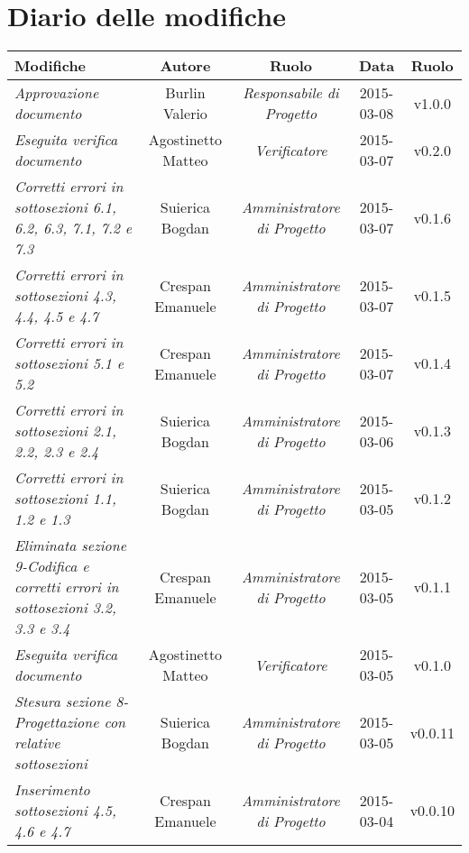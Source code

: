 \newpage
\section*{Diario delle modifiche}

\begin{table}[h]
\centering
\begin{tabular}{|p{}|c|c|c|c|}
	\toprule
		\textbf{Modifiche} & \textbf{Autore} & \textbf{Ruolo} & \textbf{Data} & \textbf{Ruolo} \\
	\midrule
	\midrule
		\textit{Approvazione documento} & Burlin Valerio & \textit{Responsabile di Progetto} & 2015-03-08 & v1.0.0 \\
	\midrule
		\textit{Eseguita verifica documento} & Agostinetto Matteo & \textit{Verificatore} & 2015-03-07 & v0.2.0 \\
	\midrule
		\textit{Corretti errori in sottosezioni 6.1, 6.2, 6.3, 7.1, 7.2 e 7.3} & Suierica Bogdan & \textit{Amministratore di Progetto} & 2015-03-07 & v0.1.6 \\
	\midrule
		\textit{Corretti errori in sottosezioni 4.3, 4.4, 4.5 e 4.7} & Crespan Emanuele & \textit{Amministratore di Progetto} & 2015-03-07 & v0.1.5 \\
    \midrule
	    \textit{Corretti errori in sottosezioni 5.1 e 5.2} & Crespan Emanuele & \textit{Amministratore di Progetto} & 2015-03-07 & v0.1.4 \\
	\midrule
		\textit{Corretti errori in sottosezioni 2.1, 2.2, 2.3 e 2.4} & Suierica Bogdan & \textit{Amministratore di Progetto} & 2015-03-06 & v0.1.3 \\
	\midrule
		\textit{Corretti errori in sottosezioni 1.1, 1.2 e 1.3} & Suierica Bogdan & \textit{Amministratore di Progetto} & 2015-03-05 & v0.1.2 \\
	\midrule
		\textit{Eliminata sezione 9-Codifica e corretti errori in sottosezioni 3.2, 3.3 e 3.4} & Crespan Emanuele & \textit{Amministratore di Progetto} & 2015-03-05 & v0.1.1 \\
	\midrule
		\textit{Eseguita verifica documento} & Agostinetto Matteo & \textit{Verificatore} & 2015-03-05 & v0.1.0 \\
	\midrule
		\textit{Stesura sezione 8-Progettazione con relative sottosezioni} & Suierica Bogdan & \textit{Amministratore di Progetto} & 2015-03-05 & v0.0.11 \\
	\midrule
		\textit{Inserimento sottosezioni 4.5, 4.6 e 4.7} & Crespan Emanuele & \textit{Amministratore di Progetto} & 2015-03-04 & v0.0.10 \\

\end{tabular}
\end{table}
